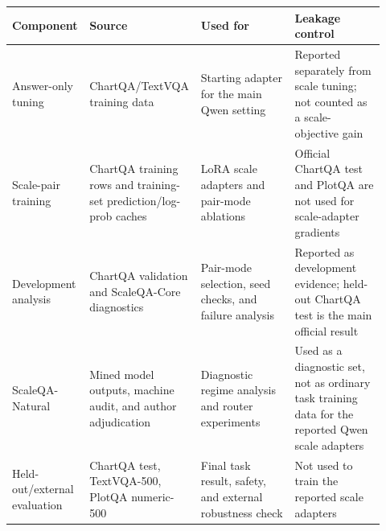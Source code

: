 \begin{tabular}{p{0.18\linewidth}p{0.25\linewidth}p{0.25\linewidth}p{0.24\linewidth}}
\toprule
Component & Source & Used for & Leakage control \\
\midrule
Answer-only tuning & ChartQA/TextVQA training data & Starting adapter for the main Qwen setting & Reported separately from scale tuning; not counted as a scale-objective gain \\
Scale-pair training & ChartQA training rows and training-set prediction/log-prob caches & LoRA scale adapters and pair-mode ablations & Official ChartQA test and PlotQA are not used for scale-adapter gradients \\
Development analysis & ChartQA validation and ScaleQA-Core diagnostics & Pair-mode selection, seed checks, and failure analysis & Reported as development evidence; held-out ChartQA test is the main official result \\
ScaleQA-Natural & Mined model outputs, machine audit, and author adjudication & Diagnostic regime analysis and router experiments & Used as a diagnostic set, not as ordinary task training data for the reported Qwen scale adapters \\
Held-out/external evaluation & ChartQA test, TextVQA-500, PlotQA numeric-500 & Final task result, safety, and external robustness check & Not used to train the reported scale adapters \\
\bottomrule
\end{tabular}
